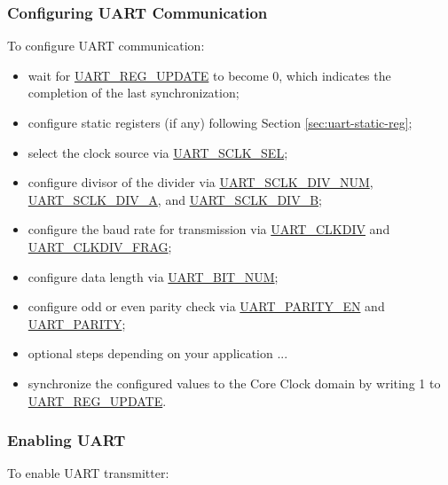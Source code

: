 \documentclass[main\_\_EN.tex]{subfiles}
\begin{document}
\subsubsection{Configuring UART Communication}

To configure UART communication:

\begin{itemize}
    \item wait for \hyperref[fielddesc:UARTREGUPDATE]{UART\_REG\_UPDATE} to become 0, which indicates the completion of the last synchronization;
    \item configure static registers (if any) following Section \ref{sec:uart-static-reg};
    \item select the clock source via \hyperref[fielddesc:UARTSCLKSEL]{UART\_SCLK\_SEL};
    \item configure divisor of the divider via \hyperref[fielddesc:UARTSCLKDIVNUM]{UART\_SCLK\_DIV\_NUM}, \hyperref[fielddesc:UARTSCLKDIVA]{UART\_SCLK\_DIV\_A}, and \hyperref[fielddesc:UARTSCLKDIVB]{UART\_SCLK\_DIV\_B};
    \item configure the baud rate for transmission via \hyperref[fielddesc:UARTCLKDIV]{UART\_CLKDIV} and \hyperref[fielddesc:UARTCLKDIVFRAG]{UART\_CLKDIV\_FRAG};
    \item configure data length via \hyperref[fielddesc:UARTBITNUM]{UART\_BIT\_NUM};
    \item configure odd or even parity check via \hyperref[fielddesc:UARTPARITYEN]{UART\_PARITY\_EN} and \hyperref[fielddesc:UARTPARITY]{UART\_PARITY};
    \item optional steps depending on your application ...
    \item synchronize the configured values to the Core Clock domain by writing 1 to \hyperref[fielddesc:UARTREGUPDATE]{UART\_REG\_UPDATE}.
\end{itemize}

\subsubsection{Enabling UART}

To enable UART transmitter:
\end{document}

